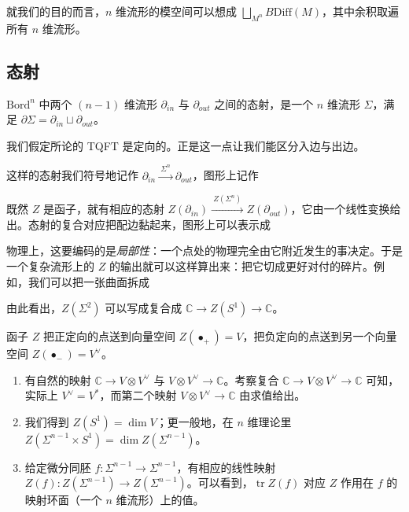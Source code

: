 \begin{rem}
就我们的目的而言，$n$ 维流形的模空间可以想成 $\bigsqcup_{M^n} B\mathrm{Diff}(M)$，其中余积取遍所有 $n$ 维流形。
\end{rem}

\subsection{态射}

$\mathrm{Bord}^n$ 中两个 $(n-1)$ 维流形 $\partial_{in}$ 与 $\partial_{out}$ 之间的态射，是一个 $n$ 维流形 $\Sigma$，满足 $\partial\Sigma=\partial_{in}\sqcup\partial_{out}$。

\begin{rem}
我们假定所论的 TQFT 是定向的。正是这一点让我们能区分入边与出边。
\end{rem}

这样的态射我们符号地记作 $\partial_{in}\xrightarrow{\ \Sigma^n\ }\partial_{out}$，图形上记作


既然 $Z$ 是函子，就有相应的态射 $Z(\partial_{in})\xrightarrow{\ Z(\Sigma^n)\ }Z(\partial_{out})$，它由一个线性变换给出。态射的复合对应把配边黏起来，图形上可以表示成


物理上，这要编码的是\emph{局部性}：一个点处的物理完全由它附近发生的事决定。于是一个复杂流形上的 $Z$ 的输出就可以这样算出来：把它切成更好对付的碎片。例如，我们可以把一张曲面拆成


由此看出，$Z(\Sigma^2)$ 可以写成复合成 $\mathbb C\to Z(S^1)\to\mathbb C$。

\begin{exmp}
函子 $Z$ 把正定向的点送到向量空间 $Z(\bullet_+)=V$，把负定向的点送到另一个向量空间 $Z(\bullet_-)=V^\vee$。

\begin{enumerate}[label=(\roman*),leftmargin=2.2em]
\item 有自然的映射 $\mathbb C\to V\otimes V^\vee$ 与 $V\otimes V^\vee\to\mathbb C$。考察复合 $\mathbb C\to V\otimes V^\vee\to\mathbb C$ 可知，实际上 $V^\vee=V^*$，而第二个映射 $V\otimes V^\vee\to\mathbb C$ 由求值给出。
\item 我们得到 $Z(S^1)=\dim V$；更一般地，在 $n$ 维理论里 $Z(\Sigma^{n-1}\times S^1)=\dim Z(\Sigma^{n-1})$。
\item 给定微分同胚 $f:\Sigma^{n-1}\to\Sigma^{n-1}$，有相应的线性映射 $Z(f):Z(\Sigma^{n-1})\to Z(\Sigma^{n-1})$。可以看到，$\operatorname{tr}Z(f)$ 对应 $Z$ 作用在 $f$ 的映射环面（一个 $n$ 维流形）上的值。
\end{enumerate}
\end{exmp}

